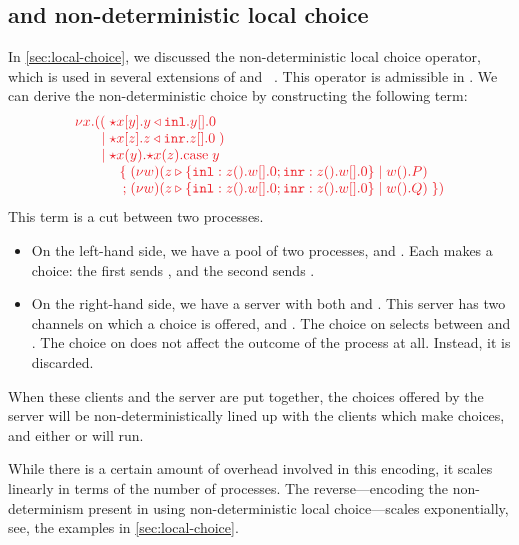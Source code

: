 \documentclass[UKenglish]{llncs}
\begin{document}
\subsection{\nodcap and non-deterministic local choice}\label{sec:nc-local-choice}
In \cref{sec:local-choice}, we discussed the non-deterministic local choice operator, which is used in several extensions of \piDILL and \cp~\parencite{atkey2016,caires2014,caires2017}. This operator is admissible in \nodcap. We can derive the non-deterministic choice  by constructing the following term:
\[%
  \arraycolsep=0pt
  \tm{
  \begin{array}{lrlrl}
    \nu x.&((  & \; \ncCnt{x}{y}{\cpInl{y}{\cpHalt{y}}} \\
          &\mid& \; \ncCnt{x}{z}{\cpInr{z}{\cpHalt{z}}} \; )\\
          &\mid& \; \ncSrv{x}{y}{\ncSrv{x}{z}{}}\text{case}\;y\\
          &    & \quad
                 \begin{array}{rl}
                   \{ & \; \cpCut{w}{\cpCase{z}{\cpWait{z}{\cpHalt{w}}}{
                           \cpWait{z}{\cpHalt{w}}}}{\cpWait{w}{P}}
                   \\
                    ; & \; \cpCut{w}{\cpCase{z}{\cpWait{z}{\cpHalt{w}}}{
                           \cpWait{z}{\cpHalt{w}}}}{\cpWait{w}{Q}} \; \})
                 \end{array}
  \end{array}
  }
\]
This term is a cut between two processes.
\begin{itemize}
\item
  On the left-hand side, we have a pool of two processes,  and . Each makes a choice: the first sends , and the second sends . 
\item
  On the right-hand side, we have a server with both  and . This server has two channels on which a choice is offered,  and . The choice on  selects between  and . The choice on  does not affect the outcome of the process at all. Instead, it is discarded.
\end{itemize}
When these clients and the server are put together, the choices offered by the server will be non-deterministically lined up with the clients which make choices, and either  or  will run.

While there is a certain amount of overhead involved in this encoding, it scales linearly in terms of the number of processes. The reverse---encoding the non-determinism present in \nodcap using non-deterministic local choice---scales exponentially, see, \eg the examples in \cref{sec:local-choice}.
\end{document}
